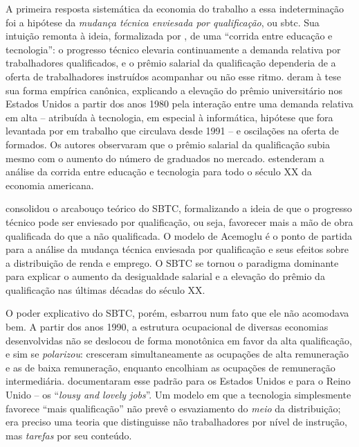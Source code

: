 
A primeira resposta sistemática da economia do trabalho a essa indeterminação foi a hipótese da \emph{mudança técnica enviesada por qualificação}, ou \gls{sbtc}. Sua intuição remonta à ideia, formalizada por \textcite{tinbergen1974, tinbergen1975}, de uma ``corrida entre educação e tecnologia'': o progresso técnico elevaria continuamente a demanda relativa por trabalhadores qualificados, e o prêmio salarial da qualificação dependeria de a oferta de trabalhadores instruídos acompanhar ou não esse ritmo. \textcite{katzMurphy1992} deram à tese sua forma empírica canônica, explicando a elevação do prêmio universitário nos Estados Unidos a partir dos anos 1980 pela interação entre uma demanda relativa em alta -- atribuída à tecnologia, em especial à informática, hipótese que fora levantada por \textcite{krueger1993} em trabalho que circulava desde 1991 -- e oscilações na oferta de formados. Os autores observaram que o prêmio salarial da qualificação subia mesmo com o aumento do número de graduados no mercado. \textcite{goldinKatz2008} estenderam a análise da corrida entre educação e tecnologia para todo o século XX da economia americana.

\textcite{acemoglu2002} consolidou o arcabouço teórico do SBTC, formalizando a ideia de que o progresso técnico pode ser enviesado por qualificação, ou seja, favorecer mais a mão de obra qualificada do que a não qualificada. O modelo de Acemoglu é o ponto de partida para a análise da mudança técnica enviesada por qualificação e seus efeitos sobre a distribuição de renda e emprego. O SBTC se tornou o paradigma dominante para explicar o aumento da desigualdade salarial e a elevação do prêmio da qualificação nas últimas décadas do século XX.

O poder explicativo do SBTC, porém, esbarrou num fato que ele não acomodava bem. A partir dos anos 1990, a estrutura ocupacional de diversas economias desenvolvidas não se deslocou de forma monotônica em favor da alta qualificação, e sim se \emph{polarizou}: cresceram simultaneamente as ocupações de alta remuneração e as de baixa remuneração, enquanto encolhiam as ocupações de remuneração intermediária. \textcite{autorKatzKearney2006, autorKatzKearney2008} documentaram esse padrão para os Estados Unidos e \textcite{goosManning2007} para o Reino Unido -- os ``\textit{lousy and lovely jobs}''. Um modelo em que a tecnologia simplesmente favorece ``mais qualificação'' não prevê o esvaziamento do \emph{meio} da distribuição; era preciso uma teoria que distinguisse não trabalhadores por nível de instrução, mas \emph{tarefas} por seu conteúdo.

